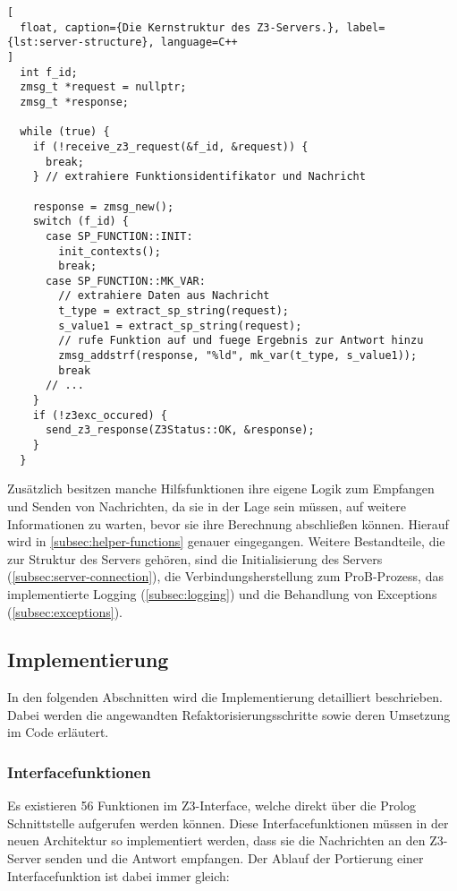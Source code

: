 \begin{lstlisting}[
  float, caption={Die Kernstruktur des Z3-Servers.}, label={lst:server-structure}, language=C++
]
  int f_id;
  zmsg_t *request = nullptr;
  zmsg_t *response;

  while (true) {
    if (!receive_z3_request(&f_id, &request)) {
      break;
    } // extrahiere Funktionsidentifikator und Nachricht

    response = zmsg_new();
    switch (f_id) {
      case SP_FUNCTION::INIT:
        init_contexts();
        break;
      case SP_FUNCTION::MK_VAR:
        // extrahiere Daten aus Nachricht
        t_type = extract_sp_string(request);
        s_value1 = extract_sp_string(request);
        // rufe Funktion auf und fuege Ergebnis zur Antwort hinzu
        zmsg_addstrf(response, "%ld", mk_var(t_type, s_value1));
        break
      // ...
    }
    if (!z3exc_occured) {
      send_z3_response(Z3Status::OK, &response);
    }
  }
\end{lstlisting}

Zusätzlich besitzen manche Hilfsfunktionen ihre eigene Logik zum Empfangen und Senden von Nachrichten,
da sie in der Lage sein müssen, auf weitere Informationen zu warten, bevor sie ihre Berechnung abschließen können.
Hierauf wird in \cref{subsec:helper-functions} genauer eingegangen.
Weitere Bestandteile, die zur Struktur des Servers gehören, sind die Initialisierung des Servers (\cref{subsec:server-connection}), die Verbindungsherstellung zum ProB-Prozess,
das implementierte Logging (\cref{subsec:logging}) und die Behandlung von Exceptions (\cref{subsec:exceptions}).

\subsection{Implementierung}

In den folgenden Abschnitten wird die Implementierung detailliert beschrieben.
Dabei werden die angewandten Refaktorisierungsschritte sowie deren Umsetzung im Code erläutert.

\subsubsection{Interfacefunktionen}
Es existieren 56 Funktionen im Z3-Interface, welche direkt über die Prolog Schnittstelle aufgerufen werden können.
Diese Interfacefunktionen müssen in der neuen Architektur so implementiert werden, dass sie die Nachrichten an den Z3-Server senden und die Antwort empfangen.
Der Ablauf der Portierung einer Interfacefunktion ist dabei immer gleich:


